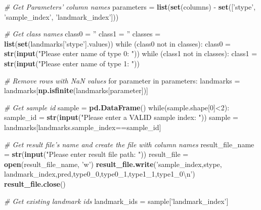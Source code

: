 \documentclass[10pt,letterpaper]{article}
\newenvironment{Shaded}{\begin{snugshade}}{\end{snugshade}}
\newcommand{\KeywordTok}[1]{\textcolor[rgb]{0.13,0.29,0.53}{\textbf{{#1}}}}
\newcommand{\DecValTok}[1]{\textcolor[rgb]{0.00,0.00,0.81}{{#1}}}
\newcommand{\CharTok}[1]{\textcolor[rgb]{0.31,0.60,0.02}{{#1}}}
\newcommand{\StringTok}[1]{\textcolor[rgb]{0.31,0.60,0.02}{{#1}}}
\newcommand{\CommentTok}[1]{\textcolor[rgb]{0.56,0.35,0.01}{\textit{{#1}}}}
\newcommand{\NormalTok}[1]{{#1}}
\begin{document}
\begin{Shaded}
\begin{Highlighting}[]
    \CommentTok{# Get Parameters' column names}
    \NormalTok{parameters =}\StringTok{ }\KeywordTok{list}\NormalTok{(}\KeywordTok{set}\NormalTok{(columns) -}
\StringTok{        }\KeywordTok{set}\NormalTok{([}\StringTok{'stype'}\NormalTok{, }\StringTok{'sample_index'}\NormalTok{, }\StringTok{'landmark_index'}\NormalTok{]))}

    \CommentTok{# Get class names}
    \NormalTok{class0 =}\StringTok{ ''}
    \NormalTok{class1 =}\StringTok{ ''}
    \NormalTok{classes =}\StringTok{ }\KeywordTok{list}\NormalTok{(}\KeywordTok{set}\NormalTok{(landmarks[}\StringTok{'stype'}\NormalTok{].values))}
    \NormalTok{while (class0 not in classes):}
\StringTok{        }\NormalTok{class0 =}\StringTok{ }\KeywordTok{str}\NormalTok{(}\KeywordTok{input}\NormalTok{(}\StringTok{"Please enter name of type 0: "}\NormalTok{))}
    \NormalTok{while (class1 not in classes):}
\StringTok{        }\NormalTok{class1 =}\StringTok{ }\KeywordTok{str}\NormalTok{(}\KeywordTok{input}\NormalTok{(}\StringTok{"Please enter name of type 1: "}\NormalTok{))}

    \CommentTok{# Remove rows with NaN values}
    \NormalTok{for parameter in parameters:}
\StringTok{        }\NormalTok{landmarks =}\StringTok{ }\NormalTok{landmarks[}\KeywordTok{np.isfinite}\NormalTok{(landmarks[parameter])]}

    \CommentTok{# Get sample id}
    \NormalTok{sample =}\StringTok{ }\KeywordTok{pd.DataFrame}\NormalTok{()}
    \NormalTok{while(sample.shape[}\DecValTok{0}\NormalTok{]<}\DecValTok{2}\NormalTok{):}
\StringTok{        }\NormalTok{sample_id =}\StringTok{ }\KeywordTok{str}\NormalTok{(}\KeywordTok{input}\NormalTok{(}\StringTok{"Please enter a VALID sample index: "}\NormalTok{))}
        \NormalTok{sample =}\StringTok{ }\NormalTok{landmarks[landmarks.sample_index==sample_id]}

    \CommentTok{# Get result file's name and create the file with column names}
    \NormalTok{result_file_name =}\StringTok{ }\KeywordTok{str}\NormalTok{(}\KeywordTok{input}\NormalTok{(}\StringTok{"Please enter result file path: "}\NormalTok{))}
    \NormalTok{result_file =}\StringTok{ }\KeywordTok{open}\NormalTok{(result_file_name, }\StringTok{'w'}\NormalTok{)}
    \KeywordTok{result_file.write}\NormalTok{(}\StringTok{'sample_index,stype,}
\StringTok{        landmark_index,pred,type0_0,type0_1,type1_1,type1_0}\CharTok{\textbackslash{}n}\StringTok{'}\NormalTok{)}
    \KeywordTok{result_file.close}\NormalTok{()}

    \CommentTok{# Get existing landmark ids}
    \NormalTok{landmark_ids =}\StringTok{ }\NormalTok{sample[}\StringTok{'landmark_index'}\NormalTok{]}


\end{Highlighting}
\end{Shaded}
\end{document}
